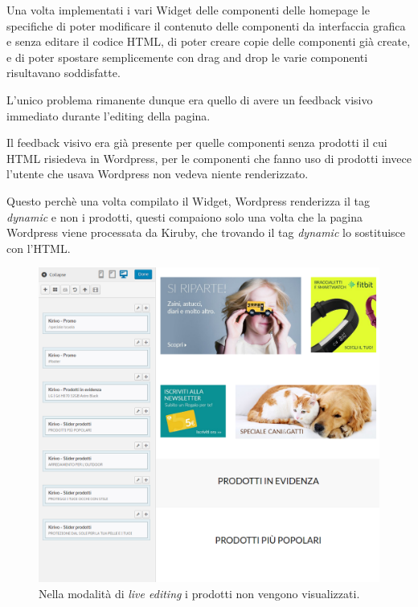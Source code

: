 


Una volta implementati i vari Widget delle componenti delle homepage le specifiche di poter
modificare il contenuto delle componenti da interfaccia grafica e senza editare
il codice HTML, di poter creare copie delle componenti già create, e di poter spostare
semplicemente con drag and drop le varie componenti risultavano soddisfatte.

L'unico problema rimanente dunque era quello di avere un feedback visivo immediato durante l'editing della pagina.

Il feedback visivo era già presente per quelle componenti senza prodotti il cui HTML risiedeva in Wordpress,
per le componenti che fanno uso di prodotti invece l'utente che usava Wordpress non vedeva niente renderizzato.

Questo perchè una volta compilato il Widget, Wordpress renderizza il tag \emph{dynamic} e non i prodotti,
questi compaiono solo una volta che la pagina Wordpress viene processata da Kiruby, che trovando il tag \emph{dynamic}
lo sostituisce con l'HTML.

\begin{figure}
  \includegraphics[width=\textwidth]{figure/noapi.png}
  \caption{Nella modalità di \emph{live editing} i prodotti non vengono visualizzati.}
  \label{fig:kspec}
\end{figure}

